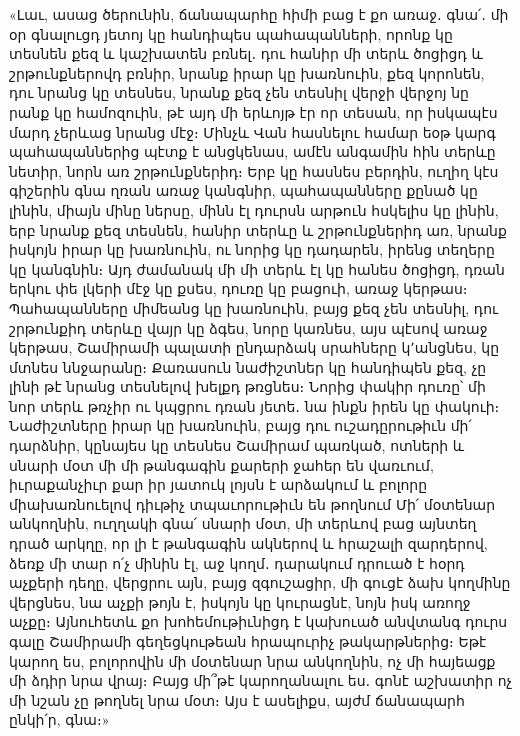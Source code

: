 \documentclass{article}
\begin{document}
{«Լաւ, ասաց ծերունին, ճանապարհը հիմի բաց է քո առաջ․ գնա՛․ մի օր գնալուցդ յետոյ կը հանդիպես պահապանների, որոնք կը տեսնեն քեզ և կաշխատեն բռնել․ դու հանիր մի տերև ծոցիցդ և շրթունքներովդ բռնիր, նրանք իրար կը խառնուին, քեզ կորոնեն, դու նրանց կը տեսնես, նրանք քեզ չեն տեսնիլ վերջի վերջոյ նը րանք կը համոզուին, թէ այդ մի երևոյթ էր որ տեսան, որ իսկապէս մարդ չերևաց նրանց մէջ։ Մինչև Վան հասնելու համար եօթ կարգ պահապաններից պէտք է անցկենաս, ամէն անգամին հին տերևը նետիր, նորն առ շրթունքներիդ։ Երբ կը հասնես բերդին, ուղիղ կէս գիշերին գնա ղռան առաջ կանգնիր, պահապանները քընած կը լինին, միայն մինը ներսը, մինն էլ դուրսն արթուն հսկելիս կը լինին, երբ նրանք քեզ տեսնեն, հանիր տերևը և շրթունքներիդ առ, նրանք իսկոյն իրար կը խառնուին, ու նորից կը դադարեն, իրենց տեղերը կը կանգնին։ Այդ ժամանակ մի մի տերև էլ կը հանես ծոցիցդ, դռան երկու փե լկերի մէջ կը քսես, դուռը կը բացուի, առաջ կերթաս։ Պահապանները միմեանց կը խառնուին, բայց քեզ չեն տեսնիլ, դու շրթունքիդ տերևը վայր կը ձգես, նորը կառնես, այս պէսով առաջ կերթաս, Շամիրամի պալատի ընդարձակ սրահները կ՚անցնես, կը մտնես ննջարանը։ Քառասուն նաժիշտներ կը հանդիպեն քեզ, չը լինի թէ նրանց տեսնելով խելքդ թռցնես։ Նորից փակիր դուռը՝ մի նոր տերև թռչիր ու կպցրու դռան յետե․ նա ինքն իրեն կը փակուի։ Նաժիշտները իրար կը խառնուին, բայց դու ուշադըրութիւն մի՛ դարձնիր, կընայես կը տեսնես Շամիրամ պառկած, ոտների և սնարի մօտ մի մի թանգագին քարերի ջահեր են վառւում, իւրաքանչիւր քար իր յատուկ լոյսն է արձակում և բոլորը միախառնուելով դիւթիչ տպաւորութիւն են թողնում Մի՛ մօտենար անկողնին, ուղղակի գնա՛ սնարի մօտ, մի տերևով բաց այնտեղ դրած արկղը, որ լի է թանգագին ակներով և հրաշալի զարդերով, ձեռք մի տար ո՛չ մինին էլ, աջ կողմ․ դարակում դրուած է հօրդ աչքերի դեղը, վերցրու այն, բայց զգուշացիր, մի գուցէ ձախ կողմինը վերցնես, նա աչքի թոյն է, իսկոյն կը կուրացնէ, նոյն իսկ առողջ աչքը։ Այնուհետև քո խոհեմութիւնիցդ է կախուած անվտանգ դուրս գալը Շամիրամի գեղեցկութեան հրապուրիչ թակարթներից։ Եթէ կարող ես, բոլորովին մի մօտենար նրա անկողնին, ոչ մի հայեացք մի ձդիր նրա վրայ։ Բայց մի՞թէ կարողանալու ես․ գոնէ աշխատիր ոչ մի նշան չը թողնել նրա մօտ։ Այս է ասելիքս, այժմ ճանապարհ ընկի՛ր, գնա։»}
\clearpage
\section{}
\end{document}
